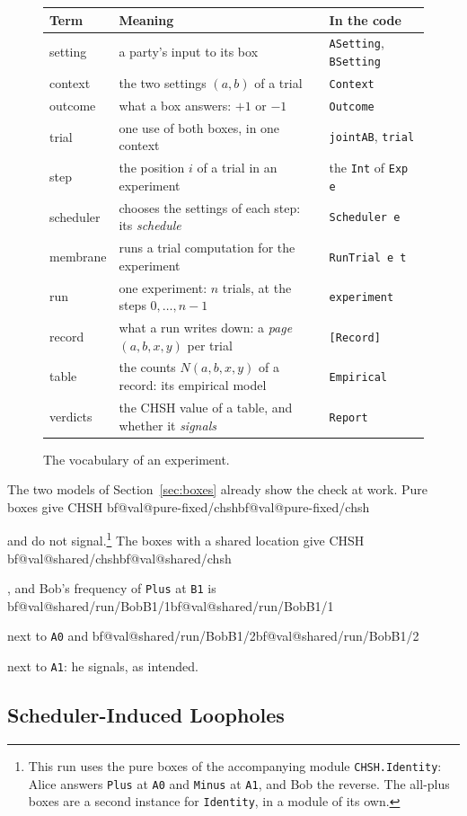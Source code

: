 \documentclass[11pt]{article}
\makeatletter
\newcommand{\hs}{\lstinline[style=hask,basicstyle=\ttfamily,frame=none]}
\newcommand{\val}[1]{\ifcsname bf@val@#1\endcsname\csname bf@val@#1\endcsname
  \else\PackageError{paper}{No value #1 in generated/values.tex}{}\fi}
\newcommand{\vty}[1]{\textcolor{HsType}{\texttt{#1}}}
\newcommand{\vfn}[1]{\textcolor{HsFunction}{\texttt{#1}}}
\makeatother
\begin{document}
\begin{figure}[htbp]
\centering
{\small\renewcommand{\arraystretch}{1.12}%
\begin{tabular}{@{}l l l@{}}
\toprule
Term & Meaning & In the code\\
\midrule
setting & a party's input to its box & \vty{ASetting}, \vty{BSetting}\\
context & the two settings $(a, b)$ of a trial & \vty{Context}\\
outcome & what a box answers: $+1$ or $-1$ & \vty{Outcome}\\
trial & one use of both boxes, in one context & \vfn{jointAB}, \vfn{trial}\\
step & the position $i$ of a trial in an experiment & the \vty{Int} of \vty{Exp}\texttt{ e}\\
scheduler & chooses the settings of each step: its \emph{schedule} & \vty{Scheduler}\texttt{ e}\\
membrane & runs a trial computation for the experiment & \vty{RunTrial}\texttt{ e t}\\
run & one experiment: $n$ trials, at the steps $0, \ldots, n-1$ & \vfn{experiment}\\
record & what a run writes down: a \emph{page} $(a, b, x, y)$ per trial & \texttt{[}\vty{Record}\texttt{]}\\
table & the counts $N(a, b, x, y)$ of a record: its empirical model & \vty{Empirical}\\
verdicts & the CHSH value of a table, and whether it \emph{signals} & \vty{Report}\\
\bottomrule
\end{tabular}}
\caption{The vocabulary of an experiment.}
\label{fig:vocabulary}
\end{figure}

The two models of Section~\ref{sec:boxes} already show the check at work. Pure boxes give CHSH \val{pure-fixed/chsh} and do not signal.\footnote{This run uses the pure boxes of the accompanying module \texttt{CHSH.Identity}: Alice answers \hs|Plus| at \hs|A0| and \hs|Minus| at \hs|A1|, and Bob the reverse. The all-plus boxes are a second instance for \hs|Identity|, in a module of its own.} The boxes with a shared location give CHSH \val{shared/chsh}, and Bob's frequency of \hs|Plus| at \hs|B1| is \val{shared/run/BobB1/1} next to \hs|A0| and \val{shared/run/BobB1/2} next to \hs|A1|: he signals, as intended.

\subsection{Scheduler-Induced Loopholes}\label{sec:clocked}
\end{document}
